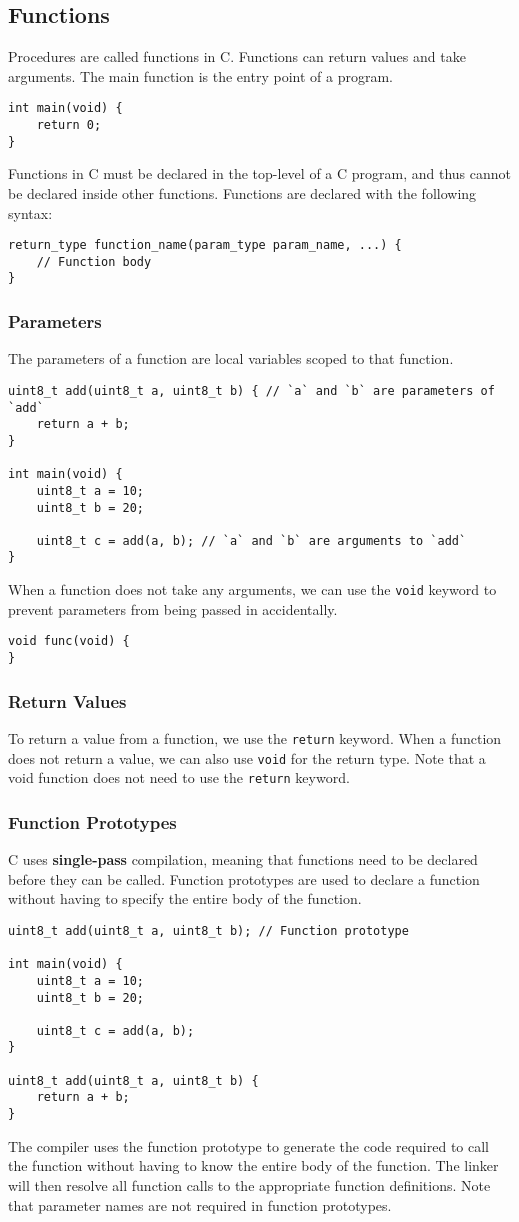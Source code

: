\documentclass{article}
\begin{document}
\subsection{Functions}
Procedures are called functions in C. Functions can return values and
take arguments. The main function is the entry point of a program.
\begin{verbatim}
int main(void) {
    return 0;
}
\end{verbatim}
Functions in C must be declared in the top-level of a C program, and
thus cannot be declared inside other functions. Functions are declared
with the following syntax:
\begin{verbatim}
return_type function_name(param_type param_name, ...) {
    // Function body
}
\end{verbatim}
\subsubsection{Parameters}
The parameters of a function are local variables scoped to that
function.
\begin{verbatim}
uint8_t add(uint8_t a, uint8_t b) { // `a` and `b` are parameters of `add`
    return a + b;
}

int main(void) {
    uint8_t a = 10;
    uint8_t b = 20;

    uint8_t c = add(a, b); // `a` and `b` are arguments to `add`
}
\end{verbatim}
When a function does not take any arguments, we can use the
\texttt{void} keyword to prevent parameters from being passed in
accidentally.
\begin{verbatim}
void func(void) {
}
\end{verbatim}
\subsubsection{Return Values}
To return a value from a function, we use the \texttt{return}
keyword. When a function does not return a value, we can also use
\texttt{void} for the return type. Note that a void function
does not need to use the \texttt{return} keyword.
\subsubsection{Function Prototypes}
C uses \textbf{single-pass} compilation, meaning that functions need to
be declared before they can be called. Function prototypes are used to
declare a function without having to specify the entire body of the
function.
\begin{verbatim}
uint8_t add(uint8_t a, uint8_t b); // Function prototype

int main(void) {
    uint8_t a = 10;
    uint8_t b = 20;

    uint8_t c = add(a, b);
}

uint8_t add(uint8_t a, uint8_t b) {
    return a + b;
}
\end{verbatim}
The compiler uses the function prototype to generate the code required
to call the function without having to know the entire body of the
function. The linker will then resolve all function calls to the
appropriate function definitions. Note that parameter names are not
required in function prototypes.
\end{document}
